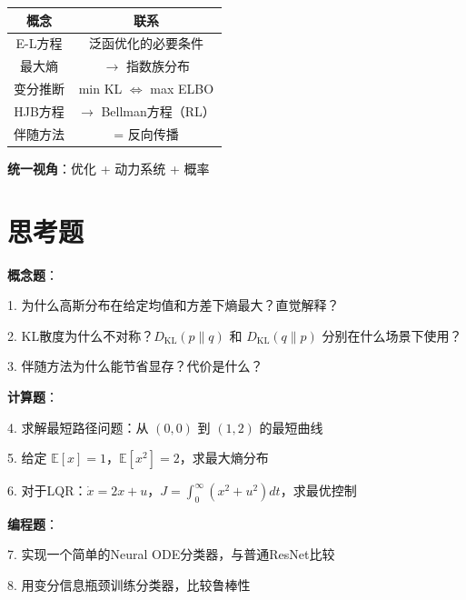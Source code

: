 \documentclass[12pt, a4paper]{ctexart}
\begin{document}
\begin{keypoint}[核心联系]

\begin{center}
\begin{tabular}{c|c}
概念 & 联系 \\
\hline
E-L方程 & 泛函优化的必要条件 \\
最大熵 & $\to$ 指数族分布 \\
变分推断 & min KL $\Leftrightarrow$ max ELBO \\
HJB方程 & $\to$ Bellman方程（RL） \\
伴随方法 & = 反向传播
\end{tabular}
\end{center}

\textbf{统一视角}：优化 + 动力系统 + 概率

\end{keypoint}

\section{思考题}

\begin{blackboard}[课后思考]

\textbf{概念题}：

1. 为什么高斯分布在给定均值和方差下熵最大？直觉解释？

2. KL散度为什么不对称？$D_{\text{KL}}(p\|q)$ 和 $D_{\text{KL}}(q\|p)$ 分别在什么场景下使用？

3. 伴随方法为什么能节省显存？代价是什么？

\textbf{计算题}：

4. 求解最短路径问题：从 $(0, 0)$ 到 $(1, 2)$ 的最短曲线

5. 给定 $\mathbb{E}[x] = 1$，$\mathbb{E}[x^2] = 2$，求最大熵分布

6. 对于LQR：$\dot{x} = 2x + u$，$J = \int_0^\infty (x^2 + u^2) dt$，求最优控制

\textbf{编程题}：

7. 实现一个简单的Neural ODE分类器，与普通ResNet比较

8. 用变分信息瓶颈训练分类器，比较鲁棒性

\end{blackboard}
\end{document}
